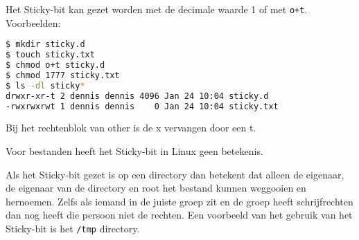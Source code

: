 Het Sticky-bit kan gezet worden met de decimale waarde 1 of met \texttt{o+t}. Voorbeelden:
\begin{lstlisting}[language=bash]
$ mkdir sticky.d
$ touch sticky.txt
$ chmod o+t sticky.d
$ chmod 1777 sticky.txt
$ ls -dl sticky*
drwxr-xr-t 2 dennis dennis 4096 Jan 24 10:04 sticky.d
-rwxrwxrwt 1 dennis dennis    0 Jan 24 10:04 sticky.txt
\end{lstlisting}
Bij het rechtenblok van other is de x vervangen door een t.

Voor bestanden heeft het Sticky-bit in Linux geen betekenis.

Als het Sticky-bit gezet is op een directory dan betekent dat alleen de eigenaar, de eigenaar van de directory en root het bestand kunnen weggooien en hernoemen. Zelfs als iemand in de juiste groep zit en de groep heeft schrijfrechten dan nog heeft die persoon niet de rechten. Een voorbeeld van het gebruik van het Sticky-bit is het \texttt{/tmp} directory.

